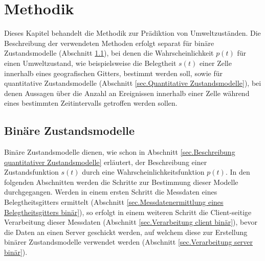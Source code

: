 \chapter{Methodik}
\label{sec.Methodik}
Dieses Kapitel behandelt die Methodik zur Prädiktion von Umweltzuständen. Die Beschreibung der verwendeten Methoden erfolgt separat für binäre Zustandsmodelle (Abschnitt \ref{sec.Binäre Zustandsmodelle}), bei denen die Wahrscheinlichkeit $p(t)$ für einen Umweltzustand, wie beispielsweise die Belegtheit $s(t)$ einer Zelle innerhalb eines geografischen Gitters, bestimmt werden soll, sowie für quantitative Zustandsmodelle (Abschnitt \ref{sec.Quantitative Zustandsmodelle}), bei denen Aussagen über die Anzahl an Ereignissen innerhalb einer Zelle während eines bestimmten Zeitintervalls getroffen werden sollen.
\section{Binäre Zustandsmodelle}
\label{sec.Binäre Zustandsmodelle}
Binäre Zustandsmodelle dienen, wie schon in Abschnitt \ref{sec.Beschreibung quantitativer Zustandsmodelle} erläutert, der Beschreibung einer Zustandsfunktion $s(t)$ durch eine Wahrscheinlichkeitsfunktion $p(t)$. In den folgenden Abschnitten werden die Schritte zur Bestimmung dieser Modelle durchgegangen. Werden in einem ersten Schritt die Messdaten eines Belegtheitsgitters ermittelt (Abschnitt \ref{sec.Messdatenermittlung eines Belegtheitsgitters binär}), so erfolgt in einem weiteren Schritt die Client-seitige Verarbeitung dieser Messdaten (Abschnitt \ref{sec.Verarbeitung client binär}), bevor die Daten an einen Server geschickt werden, auf welchem diese zur Erstellung binärer Zustandsmodelle verwendet werden (Abschnitt \ref{sec.Verarbeitung server binär}). 

